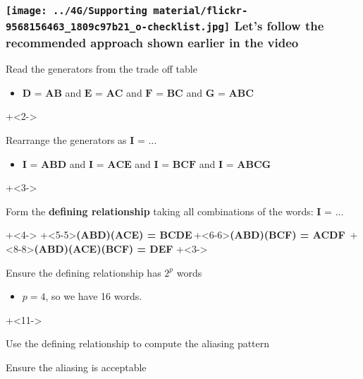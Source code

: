 \begin{frame}\frametitle{\texttt{[image: ../4G/Supporting material/flickr-9568156463\_1809c97b21\_o-checklist.jpg]} Let's follow the recommended approach shown earlier in the video}
	
	\begin{enumerate}
		\item	Read the generators from the trade off table 
			\begin{itemize}
				\item		$\textbf{D = AB}$  and $\textbf{E = AC}$ and $\textbf{F = BC}$  and $\textbf{G = ABC}$ 
			\end{itemize}
\onslide+<2->{
		\item	Rearrange the generators as  $\textbf{I = \ldots}$
			\begin{itemize}
				\item	$\textbf{I = ABD}$ and $\textbf{I = ACE}$ and $\textbf{I = BCF}$ and $\textbf{I = ABCG}$
			\end{itemize}
}
\onslide+<3->{
		\item	Form the {\color{purple}\textbf{defining relationship}} taking all combinations of the words: $\textbf{I = \ldots}$
}
\onslide+<4->{
}
\onslide+<5-5>{\textbf{(ABD)(ACE) = BCDE}}\,\onslide+<6-6>{\textbf{(ABD)(BCF) = ACDF}}\, \onslide+<8-8>{\textbf{(ABD)(ACE)(BCF) = DEF}}
\onslide+<3->{
		\item	Ensure the defining relationship has $2^p$ words
			\begin{itemize}
				\item	$p=4$, so we have 16 words.
			\end{itemize}
}
\onslide+<11->{
		\item	Use the defining relationship to compute the aliasing pattern
		\item	Ensure the aliasing is acceptable
}		
	\end{enumerate}
\end{frame}

